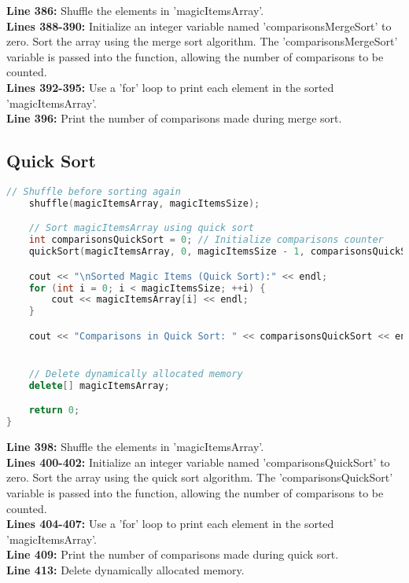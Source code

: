 \documentclass[letterpaper, 10pt,DIV=13]{scrartcl}
\numberwithin{equation}{section} %
\numberwithin{figure}{section} %
\numberwithin{table}{section} %
\begin{document}
\textbf{Line 386:} Shuffle the elements in 'magicItemsArray'. \\
\textbf{Lines 388-390:} Initialize an integer variable named 'comparisonsMergeSort' to zero. Sort the array using the merge sort algorithm. The 'comparisonsMergeSort' variable is passed into the function, allowing the number of comparisons to be counted. \\
\textbf{Lines 392-395:} Use a 'for' loop to print each element in the sorted 'magicItemsArray'. \\
\textbf{Line 396:} Print the number of comparisons made during merge sort.

\subsection{Quick Sort}
\begin{linenumbers}
\begin{lstlisting}[language=C++, caption={Quick Sort}, label={code:example}]
    // Shuffle before sorting again
    shuffle(magicItemsArray, magicItemsSize);

    // Sort magicItemsArray using quick sort
    int comparisonsQuickSort = 0; // Initialize comparisons counter
    quickSort(magicItemsArray, 0, magicItemsSize - 1, comparisonsQuickSort);

    cout << "\nSorted Magic Items (Quick Sort):" << endl;
    for (int i = 0; i < magicItemsSize; ++i) {
        cout << magicItemsArray[i] << endl;
    }

    cout << "Comparisons in Quick Sort: " << comparisonsQuickSort << endl;


    // Delete dynamically allocated memory
    delete[] magicItemsArray;

    return 0;
}
\end{lstlisting}
\end{linenumbers}
\nolinenumbers

\textbf{Line 398:} Shuffle the elements in 'magicItemsArray'. \\
\textbf{Lines 400-402:} Initialize an integer variable named 'comparisonsQuickSort' to zero. Sort the array using the quick sort algorithm. The 'comparisonsQuickSort' variable is passed into the function, allowing the number of comparisons to be counted. \\
\textbf{Lines 404-407:} Use a 'for' loop to print each element in the sorted 'magicItemsArray'. \\
\textbf{Line 409:} Print the number of comparisons made during quick sort. \\
\textbf{Line 413:} Delete dynamically allocated memory.
\end{document}
